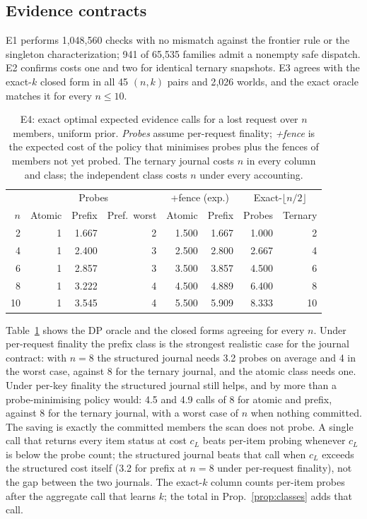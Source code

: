 \documentclass[conference,10pt]{IEEEtran}
\begin{document}
\subsection{Evidence contracts}
E1 performs 1{,}048{,}560 checks with no mismatch against the frontier rule or the singleton characterization; 941 of 65{,}535 families admit a nonempty safe dispatch. E2 confirms costs one and two for identical ternary snapshots. E3 agrees with the exact-$k$ closed form in all 45 $(n,k)$ pairs and 2{,}026 worlds, and the exact oracle matches it for every $n\le 10$.
\begin{table}[t]
\centering\footnotesize
\caption{E4: exact optimal expected evidence calls for a lost request over $n$ members, uniform prior. \emph{Probes} assume per-request finality; \emph{+fence} is the expected cost of the policy that minimises probes plus the fences of members not yet probed. The ternary journal costs $n$ in every column and class; the independent class costs $n$ under every accounting.}
\label{tab:e4}
\setlength{\tabcolsep}{3.5pt}
\begin{tabular}{@{}rrrrrrrr@{}}
\toprule
 & \multicolumn{3}{c}{Probes} & \multicolumn{2}{c}{+fence (exp.)} & \multicolumn{2}{c}{Exact-$\lfloor n/2\rfloor$}\\
$n$ & Atomic & Prefix & Pref.\ worst & Atomic & Prefix & Probes & Ternary\\
\midrule
2 & 1 & 1.667 & 2 & 1.500 & 1.667 & 1.000 & 2\\
4 & 1 & 2.400 & 3 & 2.500 & 2.800 & 2.667 & 4\\
6 & 1 & 2.857 & 3 & 3.500 & 3.857 & 4.500 & 6\\
8 & 1 & 3.222 & 4 & 4.500 & 4.889 & 6.400 & 8\\
10 & 1 & 3.545 & 4 & 5.500 & 5.909 & 8.333 & 10\\
\bottomrule
\end{tabular}
\end{table}
Table~\ref{tab:e4} shows the DP oracle and the closed forms agreeing for every $n$. Under per-request finality the prefix class is the strongest realistic case for the journal contract: with $n=8$ the structured journal needs 3.2 probes on average and 4 in the worst case, against 8 for the ternary journal, and the atomic class needs one. Under per-key finality the structured journal still helps, and by more than a probe-minimising policy would: 4.5 and 4.9 calls of 8 for atomic and prefix, against 8 for the ternary journal, with a worst case of $n$ when nothing committed. The saving is exactly the committed members the scan does not probe. A single call that returns every item status at cost $c_L$ beats per-item probing whenever $c_L$ is below the probe count; the structured journal beats that call when $c_L$ exceeds the structured cost itself (3.2 for prefix at $n=8$ under per-request finality), not the gap between the two journals. The exact-$k$ column counts per-item probes after the aggregate call that learns $k$; the total in Prop.~\ref{prop:classes} adds that call.
\end{document}
